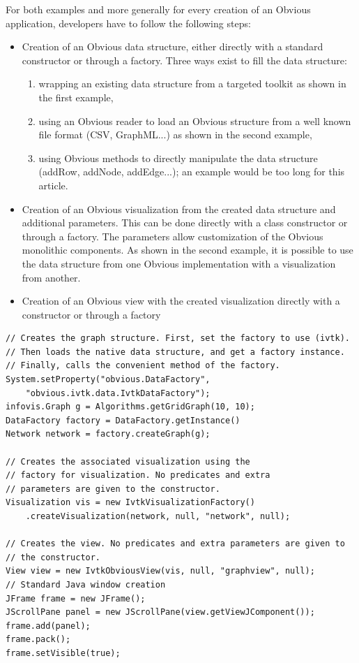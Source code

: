 For both examples and more generally for every creation of an Obvious
application, developers have to follow the following steps:
\begin{itemize}[noitemsep]
\item Creation of an Obvious data structure, either directly with a
  standard constructor or through a factory.  Three ways exist to fill
  the data structure:
  \begin{enumerate}[noitemsep]
  \item wrapping an existing data structure from a targeted toolkit as
    shown in the first example,
  \item using an Obvious reader to load an Obvious structure from a
    well known file format (CSV, GraphML...) as shown in the second
    example,
  \item using Obvious methods to directly manipulate the data
    structure (addRow, addNode, addEdge...); an example would be too
    long for this article.
 \end{enumerate}

\item Creation of an Obvious visualization from the created data
  structure and additional parameters.  This can be done directly with
  a class constructor or through a factory.  The parameters allow
  customization of the Obvious monolithic components.  As shown in the
  second example, it is possible to use the data structure from
  one Obvious implementation with a visualization from another.

 \item Creation of an Obvious view with the created visualization
   directly with a constructor or through a factory
\end{itemize} 

\begin{lstlisting}[caption={Visualizing a graph with Obvious},label=codeSample1]
// Creates the graph structure. First, set the factory to use (ivtk).
// Then loads the native data structure, and get a factory instance.
// Finally, calls the convenient method of the factory.
System.setProperty("obvious.DataFactory",
    "obvious.ivtk.data.IvtkDataFactory");
infovis.Graph g = Algorithms.getGridGraph(10, 10);
DataFactory factory = DataFactory.getInstance()
Network network = factory.createGraph(g);

// Creates the associated visualization using the
// factory for visualization. No predicates and extra
// parameters are given to the constructor.
Visualization vis = new IvtkVisualizationFactory()
    .createVisualization(network, null, "network", null);

// Creates the view. No predicates and extra parameters are given to
// the constructor.
View view = new IvtkObviousView(vis, null, "graphview", null);
// Standard Java window creation
JFrame frame = new JFrame();
JScrollPane panel = new JScrollPane(view.getViewJComponent());
frame.add(panel);
frame.pack();
frame.setVisible(true);
\end{lstlisting}


